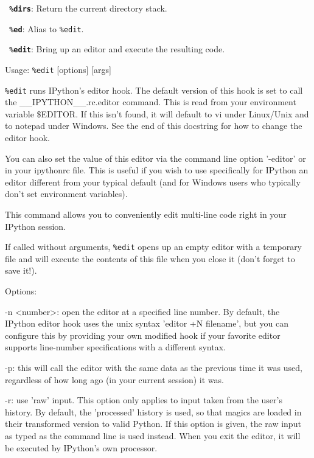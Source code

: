 \bigskip
\texttt{\textbf{ \%dirs}}:
	Return the current directory stack.

\bigskip
\texttt{\textbf{ \%ed}}:
	Alias to \texttt{\%edit}.

\bigskip
\texttt{\textbf{ \%edit}}:
	Bring up an editor and execute the resulting code.

        Usage:
          \texttt{\%edit} [options] [args]

        \texttt{\%edit} runs IPython's editor hook.  The default version of this hook is
        set to call the \_\_IPYTHON\_\_.rc.editor command.  This is read from your
        environment variable \$EDITOR.  If this isn't found, it will default to
        vi under Linux/Unix and to notepad under Windows.  See the end of this
        docstring for how to change the editor hook.

        You can also set the value of this editor via the command line option
        '-editor' or in your ipythonrc file. This is useful if you wish to use
        specifically for IPython an editor different from your typical default
        (and for Windows users who typically don't set environment variables).

        This command allows you to conveniently edit multi-line code right in
        your IPython session.
        
        If called without arguments, \texttt{\%edit} opens up an empty editor with a
        temporary file and will execute the contents of this file when you
        close it (don't forget to save it!).


        Options:

        -n <number>: open the editor at a specified line number.  By default,
        the IPython editor hook uses the unix syntax 'editor +N filename', but
        you can configure this by providing your own modified hook if your
        favorite editor supports line-number specifications with a different
        syntax.
        
        -p: this will call the editor with the same data as the previous time
        it was used, regardless of how long ago (in your current session) it
        was.

        -r: use 'raw' input.  This option only applies to input taken from the
        user's history.  By default, the 'processed' history is used, so that
        magics are loaded in their transformed version to valid Python.  If
        this option is given, the raw input as typed as the command line is
        used instead.  When you exit the editor, it will be executed by
        IPython's own processor.
        
